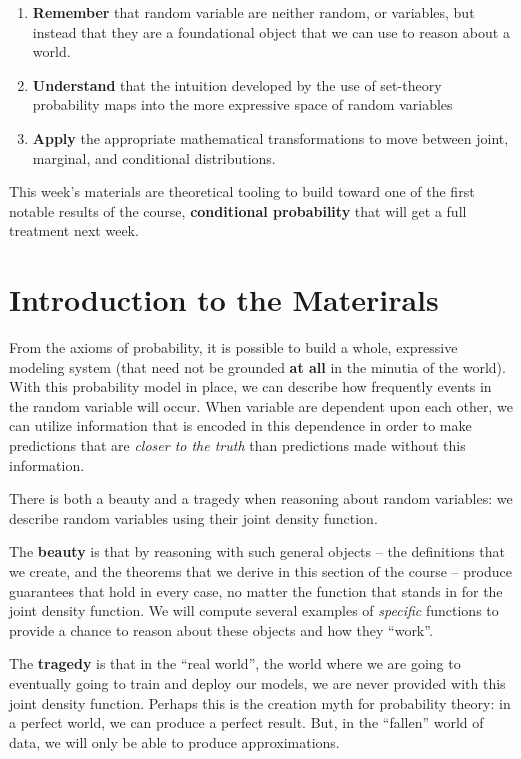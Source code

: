 \documentclass[
]{book}
\providecommand{\tightlist}{%
  \setlength{\itemsep}{0pt}\setlength{\parskip}{0pt}}
\theoremstyle{definition}
\theoremstyle{definition}
\theoremstyle{definition}
\theoremstyle{definition}
\theoremstyle{remark}
\begin{document}
\begin{enumerate}
\def\labelenumi{\arabic{enumi}.}
\tightlist
\item
  \textbf{Remember} that random variable are neither random, or variables, but instead that they are a foundational object that we can use to reason about a world.
\item
  \textbf{Understand} that the intuition developed by the use of set-theory probability maps into the more expressive space of random variables
\item
  \textbf{Apply} the appropriate mathematical transformations to move between joint, marginal, and conditional distributions.
\end{enumerate}

This week's materials are theoretical tooling to build toward one of the first notable results of the course, \textbf{conditional probability} that will get a full treatment next week.

\hypertarget{introduction-to-the-materirals}{%
\section{Introduction to the Materirals}\label{introduction-to-the-materirals}}

From the axioms of probability, it is possible to build a whole, expressive modeling system (that need not be grounded \textbf{at all} in the minutia of the world). With this probability model in place, we can describe how frequently events in the random variable will occur. When variable are dependent upon each other, we can utilize information that is encoded in this dependence in order to make predictions that are \emph{closer to the truth} than predictions made without this information.

There is both a beauty and a tragedy when reasoning about random variables: we describe random variables using their joint density function.

The \textbf{beauty} is that by reasoning with such general objects -- the definitions that we create, and the theorems that we derive in this section of the course -- produce guarantees that hold in every case, no matter the function that stands in for the joint density function. We will compute several examples of \emph{specific} functions to provide a chance to reason about these objects and how they ``work''.

The \textbf{tragedy} is that in the ``real world'', the world where we are going to eventually going to train and deploy our models, we are never provided with this joint density function. Perhaps this is the creation myth for probability theory: in a perfect world, we can produce a perfect result. But, in the ``fallen'' world of data, we will only be able to produce approximations.
\end{document}
